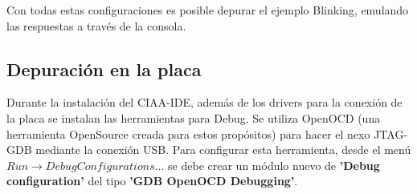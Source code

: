 \documentclass[12pt,letterpaper]{article}
\begin{document}
Con todas estas configuraciones es posible depurar el ejemplo Blinking, emulando las respuestas a través de la consola.\\


\subsection{Depuración en la placa}
Durante la instalación del CIAA-IDE, además de los drivers para la conexión de la placa se
instalan las herramientas para Debug. Se utiliza OpenOCD (una herramienta OpenSource creada para estos propósitos) para hacer el nexo JTAG-GDB mediante la conexión USB. Para configurar esta herramienta, desde el menú $Run \longrightarrow Debug Configurations… $ se debe crear un módulo nuevo de \textbf{'Debug configuration'} del tipo \textbf{'GDB OpenOCD Debugging'}.
\end{document}
